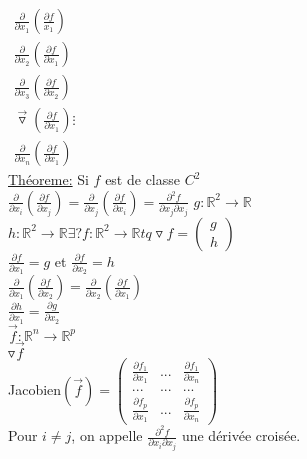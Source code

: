\documentclass{article}
\begin{document}
    $\begin{matrix}
        \frac{\partial}{\partial x_1}(\frac{\partial f}{x_1})\\
        \frac{\partial}{\partial x_2}(\frac{\partial f}{\partial x_1})\\
        \frac{\partial}{\partial x_3}(\frac{\partial f}{\partial x_2})
    \end{matrix}$\\
    \hspace*{1.5cm}
    $\begin{matrix}
        \vec{\triangledown}(\frac{\partial f}{\partial x_1}) \vdots\\
        \frac{\partial}{\partial x_n}(\frac{\partial f}{\partial x_1})
    \end{matrix}$\\
    \underline{Théoreme:} Si $f$ est de classe $C^2$\\
    $\frac{\partial}{\partial x_i}(\frac{\partial f}{\partial x_j}) =\frac{\partial}{\partial x_j}(\frac{\partial f}{\partial x_i})=\frac{\partial^2 f}{\partial x_j \partial x_j}$
    $g:\mathbb{R}^2\to \mathbb{R}$\\
    $h:\mathbb{R}^2\to \mathbb{R}$\hspace*{1cm}$\exists ? f: \mathbb{R}^2 \to \mathbb{R} tq \triangledown f=
    \begin{pmatrix}
        g\\
        h
    \end{pmatrix}$\\
    $\frac{\partial f}{\partial x_1} = g$ et
    $\frac{\partial f}{\partial x_2} = h$\\
    $\frac{\partial}{\partial x_1}(\frac{\partial f}{\partial x_2})=\frac{\partial}{\partial x_2}(\frac{\partial f}{\partial x_1})$\\
    $\frac{\partial h}{\partial x_1}=\frac{\partial g}{\partial x_2}$\\
    $\vec{f}:\mathbb{R}^n\to \mathbb{R}^p$\\
    $\triangledown \vec{f}$\\
    Jacobien$(\vec{f})=
    \begin{pmatrix}
        \frac{\partial f_1}{\partial x_1}&...&\frac{\partial f_1}{\partial x_n}\\
        ...&...&...\\
        \frac{\partial f_p}{\partial x_1}&...&\frac{\partial f_p}{\partial x_n}
    \end{pmatrix}$\\
    Pour $i\neq j$, on appelle $\frac{\partial^2 f}{\partial x_i \partial x_j}$ une dérivée croisée.\\
\end{document}
